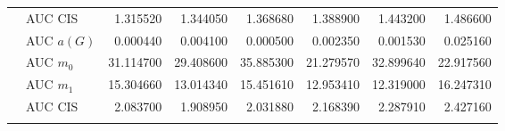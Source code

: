 \begin{table}[htbp]
\begin{tabular}{llrrrrrr}
    & AUC CIS & 1.315520 & 1.344050 & 1.368680 & 1.388900 & 1.443200 & 1.486600 \\
    \addlinespace
    \multirow{4}{*}{random} & AUC $a(G)$ & 0.000440 & 0.004100 & 0.000500 & 0.002350 & 0.001530 & 0.025160 \\
    & AUC $m_0$ & 31.114700 & 29.408600 & 35.885300 & 21.279570 & 32.899640 & 22.917560 \\
    & AUC $m_1$ & 15.304660 & 13.014340 & 15.451610 & 12.953410 & 12.319000 & 16.247310 \\
    & AUC CIS & 2.083700 & 1.908950 & 2.031880 & 2.168390 & 2.287910 & 2.427160 \\
    \addlinespace
    \bottomrule
  \end{tabular}
\end{table}

